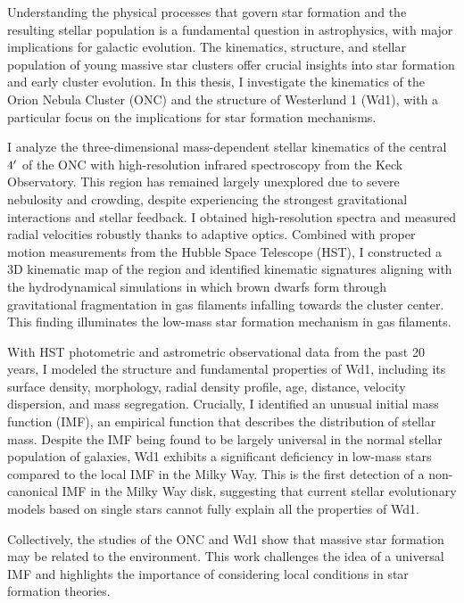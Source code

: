 \documentclass[12pt]{ucsddissertation}
\begin{document}
\begin{CJK*}{UTF8}{gbsn}
\begin{dissertationabstract}
Understanding the physical processes that govern star formation and the resulting stellar population is a fundamental question in astrophysics, with major implications for galactic evolution. The kinematics, structure, and stellar population of young massive star clusters offer crucial insights into star formation and early cluster evolution. In this thesis, I investigate the kinematics of the Orion Nebula Cluster (ONC) and the structure of Westerlund 1 (Wd1), with a particular focus on the implications for star formation mechanisms. 

I analyze the three-dimensional mass-dependent stellar kinematics of the central $4\mbox{$^\prime$}$ of the ONC with high-resolution infrared spectroscopy from the Keck Observatory. This region has remained largely unexplored due to severe nebulosity and crowding, despite experiencing the strongest gravitational interactions and stellar feedback. I obtained high-resolution spectra and measured radial velocities robustly thanks to adaptive optics. Combined with proper motion measurements from the Hubble Space Telescope (HST), I constructed a 3D kinematic map of the region and identified kinematic signatures aligning with the hydrodynamical simulations in which brown dwarfs form through gravitational fragmentation in gas filaments infalling towards the cluster center. This finding illuminates the low-mass star formation mechanism in gas filaments.

With HST photometric and astrometric observational data from the past 20 years, I modeled the structure and fundamental properties of Wd1, including its surface density, morphology, radial density profile, age, distance, velocity dispersion, and mass segregation. Crucially, I identified an unusual initial mass function (IMF), an empirical function that describes the distribution of stellar mass. Despite the IMF being found to be largely universal in the normal stellar population of galaxies, Wd1 exhibits a significant deficiency in low-mass stars compared to the local IMF in the Milky Way. This is the first detection of a non-canonical IMF in the Milky Way disk, suggesting that current stellar evolutionary models based on single stars cannot fully explain all the properties of Wd1.

Collectively, the studies of the ONC and Wd1 show that massive star formation may be related to the environment. This work challenges the idea of a universal IMF and highlights the importance of considering local conditions in star formation theories.


\end{dissertationabstract}
\end{CJK*}
\end{document}
